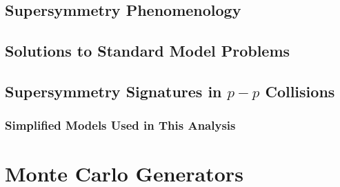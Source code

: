 \subsection{Supersymmetry Phenomenology}
\subsection{Solutions to Standard Model Problems}
\subsection{Supersymmetry Signatures in $p-p$ Collisions}
\subsubsection{Simplified Models Used in This Analysis}
\label{sec:simplified_models}

\section{Monte Carlo Generators}
\label{sec:MC_gen}